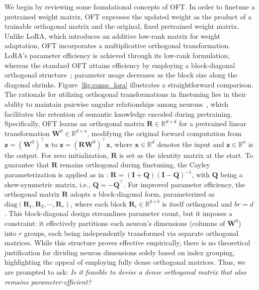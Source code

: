 We begin by reviewing some foundational concepts of OFT. In order to finetune a pretrained weight matrix, OFT expresses the updated weight as the product of a trainable orthogonal matrix and the original, fixed pretrained weight matrix. Unlike LoRA, which introduces an additive low-rank matrix for weight adaptation, OFT incorporates a multiplicative orthogonal transformation. LoRA’s parameter efficiency is achieved through its low-rank formulation, whereas the standard OFT attains efficiency by employing a block-diagonal orthogonal structure~\cite{qiu2023controlling}; parameter usage decreases as the block size along the diagonal shrinks. Figure~\ref{fig:comp_lora} illustrates a straightforward comparison. The rationale for utilizing orthogonal transformations in finetuning lies in their ability to maintain pairwise angular relationships among neurons~\cite{liu2018learning,liu2021orthogonal,qiu2023controlling}, which facilitates the retention of semantic knowledge encoded during pretraining. Specifically, OFT learns an orthogonal matrix $\bm{R}\in\mathbb{R}^{d\times d}$ for a pretrained linear transformation $\bm{W}^0\in\mathbb{R}^{d\times n}$, modifying the original forward computation from $\bm{z}=(\bm{W}^0)^\top\bm{x}$ to $\bm{z}=(\bm{R}\bm{W}^0)^\top\bm{x}$, where $\bm{x}\in\mathbb{R}^{d}$ denotes the input and $\bm{z}\in\mathbb{R}^{n}$ is the output. For zero initialization, $\bm{R}$ is set as the identity matrix at the start. To guarantee that $\bm{R}$ remains orthogonal during finetuning, the Cayley parameterization is applied as in \cite{qiu2023controlling,liu2021orthogonal}: $\bm{R}=(\bm{I}+\bm{Q})(\bm{I}-\bm{Q})^{-1}$, with $\bm{Q}$ being a skew-symmetric matrix, i.e., $\bm{Q}=-\bm{Q}^\top$. For improved parameter efficiency, the orthogonal matrix $\bm{R}$ adopts a block-diagonal form, parameterized as $\text{diag}(\bm{R}_1,\bm{R}_2,\cdots,\bm{R}_r)$, where each block $\bm{R}_i\in\mathbb{R}^{b\times b}$ is itself orthogonal and $br=d$. This block-diagonal design streamlines parameter count, but it imposes a constraint: it effectively partitions each neuron's dimensions (columns of $\bm{W}^0$) into $r$ groups, each being independently transformed via separate orthogonal matrices. While this structure proves effective empirically, there is no theoretical justification for dividing neuron dimensions solely based on index grouping, highlighting the appeal of employing fully dense orthogonal matrices. Thus, we are prompted to ask: \emph{Is it feasible to devise a dense orthogonal matrix that also remains parameter-efficient?}

